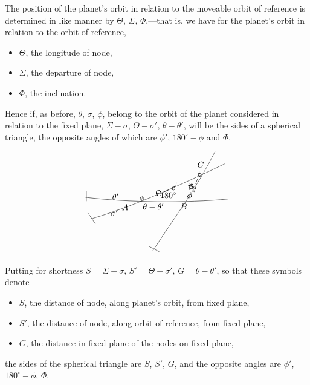 \documentclass[11pt]{article}
\begin{document}
\noindent The position of the planet's orbit in relation to the moveable orbit of reference is determined in like manner by $\Theta$, $\Sigma$, $\Phi$,---that is, we have for the planet's orbit in relation to the orbit of reference,
\begin{itemize}
\item[] $\Theta$, the longitude of node,
\item[] $\Sigma$, the departure of node,
\item[] $\Phi$, the inclination.
\end{itemize}

\noindent Hence if, as before, $\theta$, $\sigma$, $\phi$, belong to the orbit of the planet considered in relation to the fixed plane, $\Sigma-\sigma$, $\Theta-\sigma'$, $\theta-\theta'$, will be the sides of a spherical triangle, the opposite angles of which are $\phi'$, $180^{\circ}-\phi$ and $\Phi$.

\medskip
\[
\begin{tikzpicture}[scale=1.0,line cap=round,line join=round]
  \coordinate (A) at (0,0);
  \coordinate (B) at (2.45,0.03);
  \coordinate (C) at (3.42,1.28);
  \draw (-1.65,0.17) .. controls (0.15,-0.05) and (2.55,-0.07) .. (4.30,0.10);
  \draw (-1.35,-0.70) .. controls (0.20,-0.25) and (2.05,0.55) .. (4.15,1.55);
  \draw (1.15,-2.05) .. controls (2.15,-0.55) and (3.05,0.65) .. (3.75,2.05);
  \draw (-1.55,-0.48) -- (-1.25,-0.92);
  \draw (-1.62,0.02) -- (-1.62,0.42);
  \draw (1.00,-1.86) -- (1.42,-2.08);
  \node[below] at (A) {$A$};
  \node[below] at (B) {$B$};
  \node[above left] at (C) {$C$};
  \node at (-0.40,0.20) {$\theta'$};
  \node at (-0.45,-0.47) {$\sigma'$};
  \node at (1.18,-0.22) {$\theta-\theta'$};
  \node[rotate=22] at (1.75,0.48) {$\Theta-\sigma'$};
  \node[rotate=66] at (2.96,0.82) {$\Sigma-\sigma$};
  \node at (0.70,0.13) {$\phi$};
  \node at (2.13,0.23) {$180^{\circ}-\phi$};
  \node[rotate=65] at (2.76,0.63) {$\Phi$};
\end{tikzpicture}
\]

\medskip
\noindent Putting for shortness $S=\Sigma-\sigma$, $S'=\Theta-\sigma'$, $G=\theta-\theta'$, so that these symbols denote
\begin{itemize}
\item[] $S$, the distance of node, along planet's orbit, from fixed plane,
\item[] $S'$, the distance of node, along orbit of reference, from fixed plane,
\item[] $G$, the distance in fixed plane of the nodes on fixed plane,
\end{itemize}
the sides of the spherical triangle are $S$, $S'$, $G$, and the opposite angles are $\phi'$, $180^{\circ}-\phi$, $\Phi$.
\end{document}

